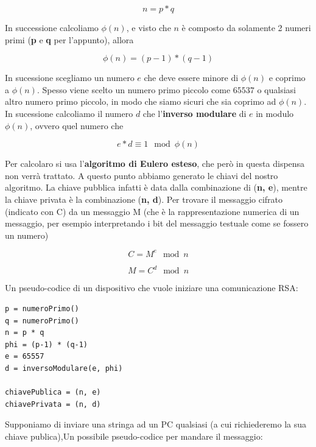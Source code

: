 \documentclass{rapport}
\begin{document}
\begin{equation*}
    n = p * q
\end{equation*}

In successione calcoliamo $\phi(n)$, e visto che $n$ è composto da solamente 2 numeri primi (\textbf{p} e \textbf{q} per l'appunto), allora 

\begin{equation*}
    \phi(n) = (p -1 ) * (q -1 )
\end{equation*}


In sucessione scegliamo un numero $e$ che deve essere minore di $\phi(n)$ e coprimo a $\phi(n)$. Spesso viene scelto un numero primo piccolo come $65537$ o qualsiasi altro numero primo piccolo, in modo che siamo sicuri che sia coprimo ad $\phi(n)$. In sucessione calcoliamo il numero $d$ che l'\textbf{inverso modulare} di $e$ in modulo $\phi(n)$, ovvero quel numero che 


\begin{equation*}
    e * d \equiv 1 \mod \phi(n)
\end{equation*}


Per calcolaro si usa l'\textbf{algoritmo di Eulero esteso}, che però in questa dispensa non verrà trattato. A questo punto abbiamo generato le chiavi del nostro algoritmo. La chiave pubblica infatti è data dalla combinazione di (\textbf{n, e}), mentre la chiave privata è la combinazione (\textbf{n, d}). Per trovare il messaggio cifrato (indicato con C) da un messaggio M (che è la rappresentazione numerica di un messaggio, per esempio interpretando i bit del messaggio testuale come se fossero un numero)

\begin{equation*}
    C = M^e \mod n
\end{equation*}


\begin{equation*}
    M = C^d \mod n
\end{equation*}




Un pseudo-codice di un dispositivo che vuole iniziare una comunicazione RSA: 

\begin{lstlisting}[language=CustomPython]
p = numeroPrimo()
q = numeroPrimo()
n = p * q
phi = (p-1) * (q-1)
e = 65557
d = inversoModulare(e, phi)

chiavePublica = (n, e)
chiavePrivata = (n, d)
\end{lstlisting}

\newpage
Supponiamo di inviare una stringa ad un PC qualsiasi (a cui richiederemo la sua chiave publica),Un possibile pseudo-codice per mandare il messaggio:  
\end{document}
